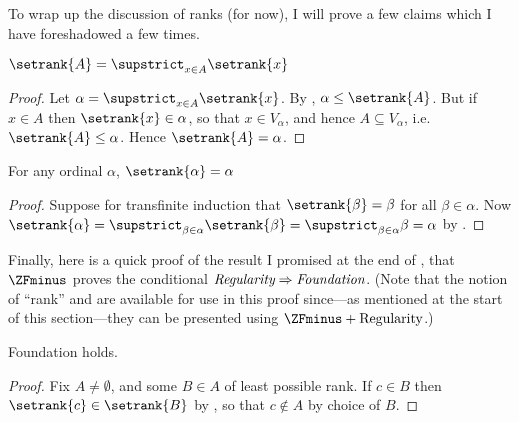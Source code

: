 \documentclass[../../../include/open-logic-section]{subfiles}
\begin{document}
To wrap up the discussion of ranks (for now), I will prove a few claims which I have foreshadowed a few times. 
\begin{prop}
	$\setrank{A} = \supstrict_{x \in A}\setrank{x}$
\end{prop}
\begin{proof}
	Let $\alpha = \supstrict_{x \in A}\setrank{x}$. By , $\alpha \leq \setrank{A}$. But if $x \in A$ then $\setrank{x} \in \alpha$, so that $x \in V_\alpha$, and hence $A \subseteq V_\alpha$, i.e.\ $\setrank{A} \leq \alpha$. Hence $\setrank{A} = \alpha$.
\end{proof}
\begin{cor}
	For any ordinal $\alpha$, $\setrank{\alpha} = \alpha$
\end{cor}
\begin{proof}
	Suppose for transfinite induction that $\setrank{\beta} = \beta$ for all $\beta \in \alpha$. Now $\setrank{\alpha} = \supstrict_{\beta \in \alpha}\setrank{\beta} = \supstrict_{\beta \in \alpha}\beta = \alpha$ by .
%
\end{proof}\noindent
Finally, here is a quick proof of the result I promised at the end of , that $\ZFminus$ proves the conditional $\emph{Regularity} \Rightarrow \emph{Foundation}$. (Note that the notion of ``rank'' and  are available for use in this proof since---as mentioned at the start of this section---they can be presented using $\ZFminus + \text{Regularity}$.)
\begin{prop} Foundation holds.
\end{prop}
\begin{proof}
	Fix $A \neq \emptyset$, and some $B \in A$ of least possible rank. If $c \in B$ then $\setrank{c} \in \setrank{B}$ by , so that $c \notin A$ by choice of $B$.
\end{proof}
\end{document}
